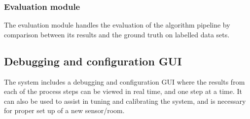 \subsubsection{Evaluation module}
The evaluation module handles the evaluation of the algorithm pipeline by comparison between its results and the ground truth on labelled data sets.  

\subsection{Debugging and configuration GUI}
The system includes a debugging and configuration GUI where the results from each of the process steps can be viewed in real time, and one step at a time. It can also be used to assist in tuning and calibrating the system, and is necessary for proper set up of a new sensor/room. 
